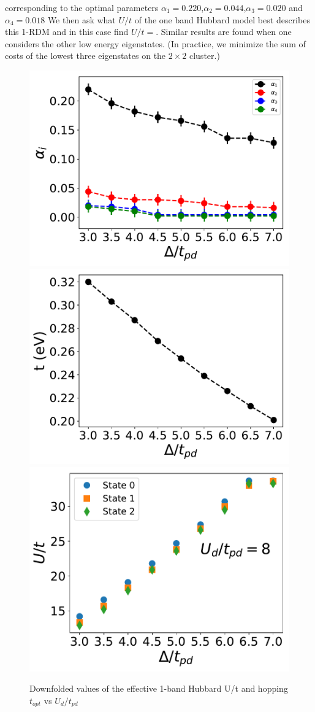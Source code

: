 corresponding to the optimal parameters $\alpha_1=0.220$,$\alpha_2=0.044$,$\alpha_3=0.020$ and $\alpha_4=0.018$ 
We then ask what $U/t$ of the one band Hubbard model best describes this 1-RDM and in this case find $U/t = $. 
Similar results are found when one considers the other low energy eigenstates. 
(In practice, we minimize the sum of costs of the lowest three eigenstates on the $2 \times 2$ cluster.) 

\begin{figure}[]
\centering
\includegraphics[width=0.32\linewidth]{./Figures/Hyb_vs_U_Ud_8.pdf}
\includegraphics[width=0.32\linewidth]{./Figures/Hopping_vs_U_Ud_8.pdf}
\includegraphics[width=0.32\linewidth]{./Figures/downfolded_U_Ud_8.pdf}
\caption{Downfolded values of the effective 1-band Hubbard U/t and hopping $t_{opt}$ vs $U_d/t_{pd}$}
\label{fig:hamfit} 
\end{figure}	

